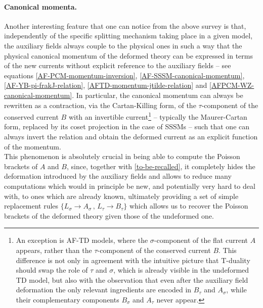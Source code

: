 \documentclass[12pt]{article}
\numberwithin{equation}{section}
\begin{document}
\paragraph{Canonical momenta.} Another interesting feature that one can notice from the above survey is that, independently of the specific splitting mechanism taking place in a given model, the auxiliary fields always couple to the physical ones in such a way that the physical canonical momentum of the deformed theory can be expressed in terms of the new currents without explicit reference to the auxiliary fields -- see equations \eqref{AF-PCM-momentum-inversion}, \eqref{AF-SSSM-canonical-momentum}, \eqref{AF-YB-pi-frakJ-relation}, \eqref{AFTD-momentum-jtilde-relation} and \eqref{AFPCM-WZ-canonical-momentum}. In particular, the canonical momentum can always be rewritten as a contraction, via the Cartan-Killing form, of the $\tau$-component of the conserved current $B$ with an invertible current\footnote{An exception is AF-TD models, where the $\sigma$-component of the flat current $A$ appears, rather than the $\tau$-component of the conserved current $B$. This difference is not only in agreement with the intuitive picture that T-duality should swap the role of $\tau$ and $\sigma$, which is already visible in the undeformed TD model, but also with the observation that even after the auxiliary field deformation the only relevant ingredients are encoded in $B_{\tau}$ and $A_{\sigma}$, while their complementary components $B_{\sigma}$ and $A_{\tau}$ never appear.} -- typically the Maurer-Cartan form, replaced by its coset projection in the case of SSSMs -- such that one can always invert the relation and obtain the deformed current as an explicit function of the momentum. \\
\indent
This phenomenon is absolutely crucial in being able to compute the Poisson brackets of $A$ and $B$, since, together with \eqref{to-be-recalled}, it completely hides the deformation introduced by the auxiliary fields and allows to reduce many computations which would in principle be new, and potentially very hard to deal with, to ones which are already known, ultimately providing a set of simple replacement rules $\{L_{\sigma}\rightarrow A_{\sigma} \, , \, L_{\tau}\rightarrow B_{\tau}\}$ which allows us to recover the Poisson brackets of the deformed theory given those of the undeformed one.  
\end{document}
